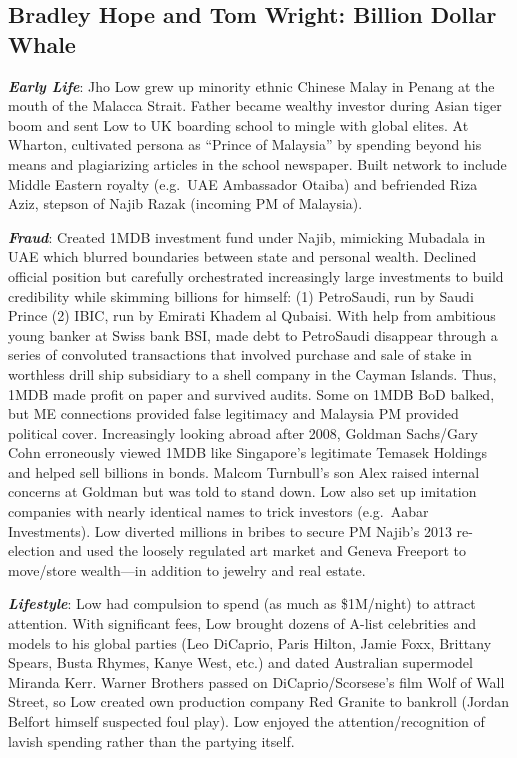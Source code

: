 \documentclass[
]{article}
\begin{document}
\hypertarget{bradley-hope-and-tom-wright-billion-dollar-whale}{%
\subsection{Bradley Hope and Tom Wright: Billion Dollar
Whale}\label{bradley-hope-and-tom-wright-billion-dollar-whale}}

\textbf{\emph{Early Life}}: Jho Low grew up minority ethnic Chinese
Malay in Penang at the mouth of the Malacca Strait. Father became
wealthy investor during Asian tiger boom and sent Low to UK boarding
school to mingle with global elites. At Wharton, cultivated persona as
``Prince of Malaysia'' by spending beyond his means and plagiarizing
articles in the school newspaper. Built network to include Middle
Eastern royalty (e.g.~UAE Ambassador Otaiba) and befriended Riza Aziz,
stepson of Najib Razak (incoming PM of Malaysia).

\textbf{\emph{Fraud}}: Created 1MDB investment fund under Najib,
mimicking Mubadala in UAE which blurred boundaries between state and
personal wealth. Declined official position but carefully orchestrated
increasingly large investments to build credibility while skimming
billions for himself: (1) PetroSaudi, run by Saudi Prince (2) IBIC, run
by Emirati Khadem al Qubaisi. With help from ambitious young banker at
Swiss bank BSI, made debt to PetroSaudi disappear through a series of
convoluted transactions that involved purchase and sale of stake in
worthless drill ship subsidiary to a shell company in the Cayman
Islands. Thus, 1MDB made profit on paper and survived audits. Some on
1MDB BoD balked, but ME connections provided false legitimacy and
Malaysia PM provided political cover. Increasingly looking abroad after
2008, Goldman Sachs/Gary Cohn erroneously viewed 1MDB like Singapore's
legitimate Temasek Holdings and helped sell billions in bonds. Malcom
Turnbull's son Alex raised internal concerns at Goldman but was told to
stand down. Low also set up imitation companies with nearly identical
names to trick investors (e.g.~Aabar Investments). Low diverted millions
in bribes to secure PM Najib's 2013 re-election and used the loosely
regulated art market and Geneva Freeport to move/store wealth---in
addition to jewelry and real estate.

\textbf{\emph{Lifestyle}}: Low had compulsion to spend (as much as
\$1M/night) to attract attention. With significant fees, Low brought
dozens of A-list celebrities and models to his global parties (Leo
DiCaprio, Paris Hilton, Jamie Foxx, Brittany Spears, Busta Rhymes, Kanye
West, etc.) and dated Australian supermodel Miranda Kerr. Warner
Brothers passed on DiCaprio/Scorsese's film Wolf of Wall Street, so Low
created own production company Red Granite to bankroll (Jordan Belfort
himself suspected foul play). Low enjoyed the attention/recognition of
lavish spending rather than the partying itself.
\end{document}
